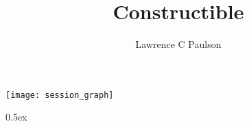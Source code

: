 \documentclass[11pt,a4paper]{article}
\begin{document}
\title{Constructible}
\author{Lawrence C Paulson}
\maketitle

\tableofcontents

\begin{center}
  \texttt{[image: session\_graph]}
\end{center}

\newpage

\parindent 0pt\parskip 0.5ex



%
%
\end{document}
